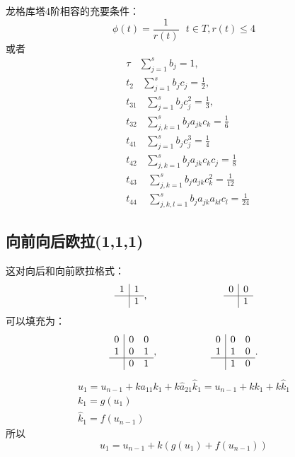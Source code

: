 \documentclass[12pt,a4paper]{article}
\numberwithin{equation}{section}
\begin{document}
龙格库塔4阶相容的充要条件：
\begin{equation*}
\phi(t)=\frac{1}{r(t)} ~~~t\in T,r(t)\le 4
\end{equation*}
或者
\begin{align*}
&\tau~~~~\sum_{j=1}^{s}b_{j}=1,\\
&t_{2}~~~~\sum_{j=1}^{s}b_{j}c_{j}=\frac{1}{2},\\
&t_{31}~~~~\sum_{j=1}^{s}b_{j}c_{j}^2=\frac{1}{3},\\
&t_{32}~~~~\sum_{j,k=1}^{s}b_{j}a_{jk}c_{k}=\frac{1}{6}\\
&t_{41}~~~~\sum_{j=1}^{s}b_{j}c_{j}^3=\frac{1}{4}\\
&t_{42}~~~~\sum_{j,k=1}^{s}b_{j}a_{jk}c_{k}c_{j}=\frac{1}{8}\\
&t_{43}~~~~~\sum_{j,k=1}^{s}b_{j}a_{jk}c_{k}^2=\frac{1}{12}\\
&t_{44}~~~~~\sum_{j,k,l=1}^{s}b_{j}a_{jk}a_{kl}c_{l}=\frac{1}{24}
\end{align*}
\subsection{向前向后欧拉(1,1,1)}

这对向后和向前欧拉格式：
\[
\begin{array}{r|r}
1 & 1 \\
\hline
& 1
\end{array},~~~~~~~~~~~~~~~~~~~~~~~
\begin{array}{r|r}
0 & 0 \\
\hline
& 1 
\end{array}
\]
可以填充为：
\[
\begin{array}{r|rr}
0 & 0 & 0 \\
1 & 0 & 1 \\
\hline
& 0 & 1
\end{array},~~~~~~~~~~~~~~~~
\begin{array}{r|rr}
0 & 0 & 0\\
1 & 1 & 0\\
\hline
& 1 & 0
\end{array}.
\]
\begin{gather*}
u_{1}=u_{n-1}+ka_{11}k_{1}+k\hat{a}_{21}\hat{k}_{1}=u_{n-1}+k k_{1}+k \hat{k}_{1}\\
k_{1}=g(u_{1})\\
\hat{k}_{1}=f(u_{n-1})
\end{gather*}
所以
\begin{equation*}
u_{1}=u_{n-1}+k(g(u_{1})+f(u_{n-1}))
\end{equation*}
\end{document}
